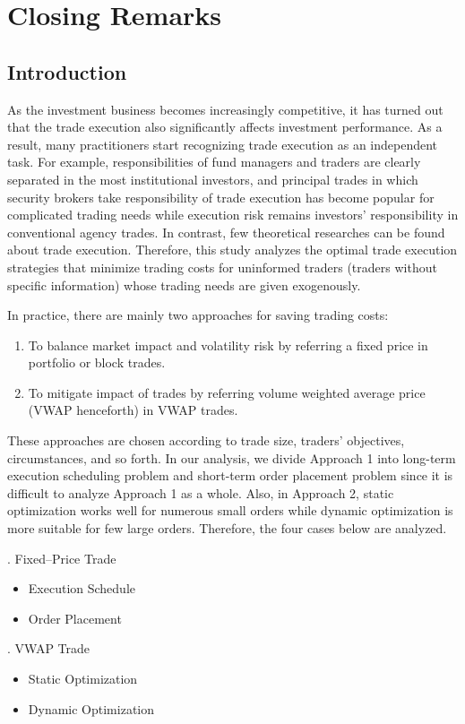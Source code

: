 
\chapter{Closing Remarks}\label{chap_c}
\section{Introduction}\label{sec_c1}
As the investment business becomes increasingly competitive, it has turned out that the trade execution also significantly affects investment performance.  As a result, many practitioners start recognizing trade execution as an independent task.  For example, responsibilities of fund managers and traders are clearly separated in the most institutional investors, and principal trades in which security brokers take responsibility of trade execution has become popular for complicated trading needs while execution risk remains investors' responsibility in conventional agency trades.  In contrast, few theoretical researches can be found about trade execution.  Therefore, this study analyzes the optimal trade execution strategies that minimize trading costs for uninformed traders (traders without specific information) whose trading needs are given exogenously. 

In practice, there are mainly two approaches for saving trading costs: 
\begin{enumerate}
\item To balance market impact and volatility risk by referring a fixed price in portfolio or block trades.
\item To mitigate impact of trades by referring volume weighted average price (VWAP henceforth) in VWAP trades.  
\end{enumerate}
These approaches are chosen according to trade size, traders' objectives, circumstances, and so forth.  In our analysis, we divide Approach 1 into long-term execution scheduling problem and short-term order placement problem since it is difficult to analyze Approach 1 as a whole.  Also, in Approach 2, static optimization works well for numerous small orders while dynamic optimization is more suitable for few large orders.  Therefore, the four cases below are analyzed.

\bigskip

. Fixed--Price Trade
\begin{itemize}
\item Execution Schedule
\item Order Placement
\end{itemize}
. VWAP Trade
\begin{itemize}
\item Static Optimization
\item Dynamic Optimization
\end{itemize}


